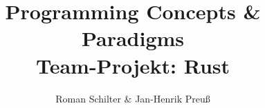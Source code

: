 \documentclass[aspectratio=169, professionalfonts]{beamer}
\title[PCP-Rust]{Programming Concepts \& Paradigms\\ Team-Projekt: Rust}
\author[Schilter \& Preuß]{Roman Schilter \& Jan-Henrik Preuß}
\begin{document}
\typesetFrontSlides












\end{document}
